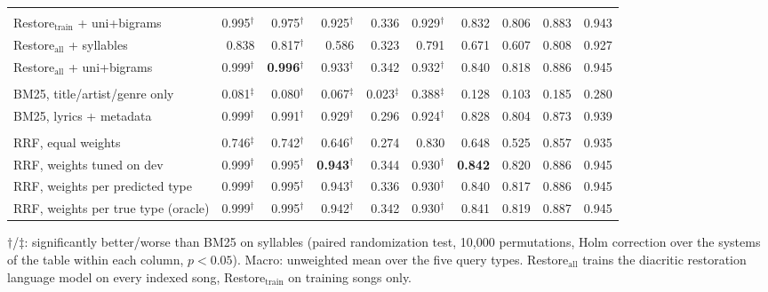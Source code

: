 \begin{table}[t]
\begin{tabular}{@{}l rrrrr r rrr@{}}
\addlinespace
\multicolumn{10}{l}{\textit{Diacritic restoration}} \\
\quad Restore$_{\mathrm{train}}$ + uni+bigrams & 0.995$^{\dagger}$ & 0.975$^{\dagger}$ & 0.925$^{\dagger}$ & 0.336 & 0.929$^{\dagger}$ & 0.832 & 0.806 & 0.883 & 0.943 \\
\quad Restore$_{\mathrm{all}}$ + syllables & 0.838 & 0.817$^{\dagger}$ & 0.586 & 0.323 & 0.791 & 0.671 & 0.607 & 0.808 & 0.927 \\
\quad Restore$_{\mathrm{all}}$ + uni+bigrams & 0.999$^{\dagger}$ & \textbf{0.996}$^{\dagger}$ & 0.933$^{\dagger}$ & 0.342 & 0.932$^{\dagger}$ & 0.840 & 0.818 & 0.886 & 0.945 \\
\addlinespace
\multicolumn{10}{l}{\textit{Metadata}} \\
\quad BM25, title/artist/genre only & 0.081$^{\ddagger}$ & 0.080$^{\dagger}$ & 0.067$^{\ddagger}$ & 0.023$^{\ddagger}$ & 0.388$^{\ddagger}$ & 0.128 & 0.103 & 0.185 & 0.280 \\
\quad BM25, lyrics + metadata & 0.999$^{\dagger}$ & 0.991$^{\dagger}$ & 0.929$^{\dagger}$ & 0.296 & 0.924$^{\dagger}$ & 0.828 & 0.804 & 0.873 & 0.939 \\
\addlinespace
\multicolumn{10}{l}{\textit{Lexical fusion (RRF)}} \\
\quad RRF, equal weights & 0.746$^{\ddagger}$ & 0.742$^{\dagger}$ & 0.646$^{\dagger}$ & 0.274 & 0.830 & 0.648 & 0.525 & 0.857 & 0.935 \\
\quad RRF, weights tuned on dev & 0.999$^{\dagger}$ & 0.995$^{\dagger}$ & \textbf{0.943}$^{\dagger}$ & 0.344 & 0.930$^{\dagger}$ & \textbf{0.842} & 0.820 & 0.886 & 0.945 \\
\quad RRF, weights per predicted type & 0.999$^{\dagger}$ & 0.995$^{\dagger}$ & 0.943$^{\dagger}$ & 0.336 & 0.930$^{\dagger}$ & 0.840 & 0.817 & 0.886 & 0.945 \\
\quad RRF, weights per true type (oracle) & 0.999$^{\dagger}$ & 0.995$^{\dagger}$ & 0.942$^{\dagger}$ & 0.342 & 0.930$^{\dagger}$ & 0.841 & 0.819 & 0.887 & 0.945 \\
\bottomrule
\end{tabular}

\vspace{2pt}
\parbox{\textwidth}{\footnotesize $\dagger$/$\ddagger$: significantly better/worse than BM25 on syllables (paired randomization test, 10{,}000 permutations, Holm correction over the systems of the table within each column, $p<0.05$). Macro: unweighted mean over the five query types. Restore$_{\mathrm{all}}$ trains the diacritic restoration language model on every indexed song, Restore$_{\mathrm{train}}$ on training songs only.}
\end{table}

